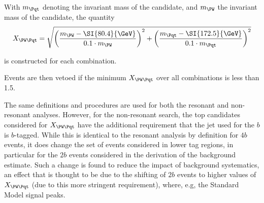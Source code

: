With $m_{\Pqt}$ denoting the invariant mass of the \Pqt candidate, and $m_{\PW}$
the invariant mass of the \PW candidate, the quantity
\begin{equation}
	\label{eqn:xwt-def}
	X_{\PW\Pqt} = \sqrt{\qty(\frac{m_{\PW} - \SI{80.4}{\GeV}}{0.1\cdot m_{\PW}})^{2} + \qty(\frac{m_{\Pqt} - \SI{172.5}{\GeV}}{0.1\cdot m_{\Pqt}})^{2}}
\end{equation}

is constructed for each combination.

Events are then vetoed if the minimum $X_{\PW\Pqt}$ over all combinations is
less than 1.5.

The same definitions and procedures are used for both the resonant and non-resonant analyses.
However, for the non-resonant search, the top candidates considered for $X_{\PW\Pqt}$ have the 
additional requirement that the jet used for the $b$ is $b$-tagged. While this is identical
to the resonant analysis by definition for $4b$ events, it does change the set of events 
considered in lower tag regions, in particular for the $2b$ events considered in the derivation
of the background estimate. Such a change is found to reduce the impact of background systematics, an 
effect that is thought to be due to the shifting of $2b$ events to higher values of $X_{\PW\Pqt}$ (due to 
this more stringent requirement), where, e.g, the Standard Model signal peaks.

